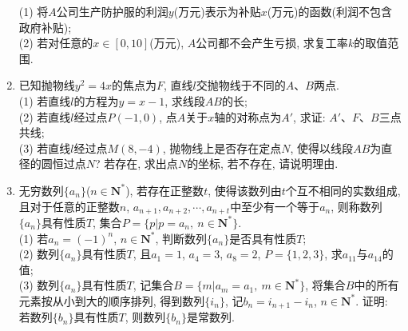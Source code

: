 \documentclass[10pt,a4paper]{article}
\begin{document}
\begin{enumerate}[1.]
(1) 将$A$公司生产防护服的利润$y$(万元)表示为补贴$x$(万元)的函数(利润不包含政府补贴);\\
(2) 若对任意的$x\in [0,10]$(万元), $A$公司都不会产生亏损, 求复工率$k$的取值范围.
\item 已知抛物线$y^2=4x$的焦点为$F$, 直线$l$交抛物线于不同的$A$、$B$两点.\\
(1) 若直线$l$的方程为$y=x-1$, 求线段$AB$的长;\\
(2) 若直线$l$经过点$P(-1,0)$, 点$A$关于$x$轴的对称点为$A'$, 求证: $A'$、$F$、$B$三点共线;\\
(3) 若直线$l$经过点$M(8,-4)$, 抛物线上是否存在定点$N$, 使得以线段$AB$为直径的圆恒过点$N$? 若存在, 求出点$N$的坐标, 若不存在, 请说明理由.
\item 无穷数列$\{a_n\}$($n\in \mathbf{N}^*$), 若存在正整数$t$, 使得该数列由$t$个互不相同的实数组成, 且对于任意的正整数$n$, $a_{n+1},a_{n+2},\cdots,a_{n+t}$中至少有一个等于$a_n$, 则称数列$\{a_n\}$具有性质$T$, 集合$P=\{p|p=a_n, \ n\in \mathbf{N}^*\}$.\\
(1) 若$a_n=(-1)^n$, $n\in \mathbf{N}^*$, 判断数列$\{a_n\}$是否具有性质$T$;\\
(2) 数列$\{a_n\}$具有性质$T$, 且$a_1=1$, $a_4=3$, $a_8=2$, $P=\{1,2,3\}$, 求$a_{11}$与$a_{14}$的值;\\
(3) 数列$\{a_n\}$具有性质$T$, 记集合$B=\{m|a_m=a_1, \ m\in \mathbf{N}^*\}$, 将集合$B$中的所有元素按从小到大的顺序排列, 得到数列$\{i_n\}$, 记$b_n=i_{n+1}-i_n$, $n\in \mathbf{N}^*$. 证明: 若数列$\{b_n\}$具有性质$T$, 则数列$\{b_n\}$是常数列.
\end{enumerate}
\end{document}

